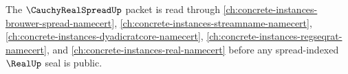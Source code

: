 The $\CauchyRealSpreadUp$ packet is read through \autoref{ch:concrete-instances-brouwer-spread-namecert}, \autoref{ch:concrete-instances-streamname-namecert}, \autoref{ch:concrete-instances-dyadicratcore-namecert}, \autoref{ch:concrete-instances-regseqrat-namecert}, and \autoref{ch:concrete-instances-real-namecert} before any spread-indexed $\RealUp$ seal is public.
